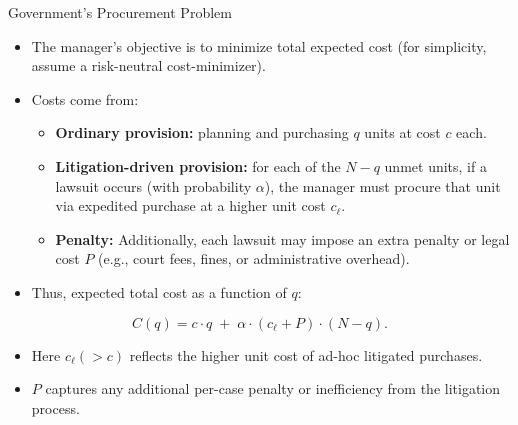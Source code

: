 \documentclass{beamer}
\begin{document}
\begin{frame}{Government’s Procurement Problem}
\begin{itemize}
  \item The manager’s objective is to minimize total expected cost (for simplicity, assume a risk-neutral cost-minimizer).
  \item Costs come from:
    \begin{itemize}
      \item \textbf{Ordinary provision:} planning and purchasing $q$ units at cost $c$ each.
      \item \textbf{Litigation-driven provision:} for each of the $N - q$ unmet units, if a lawsuit occurs (with probability $\alpha$), the manager must procure that unit via expedited purchase at a higher unit cost $c_{\ell}$.
      \item \textbf{Penalty:} Additionally, each lawsuit may impose an extra penalty or legal cost $P$ (e.g., court fees, fines, or administrative overhead).
    \end{itemize}
  \item Thus, expected total cost as a function of $q$:
\end{itemize}
\[
    C(q) = c \cdot q \;+\; \alpha \cdot (c_{\ell} + P) \cdot (N - q).
\]
\begin{itemize}
  \item Here $c_{\ell} (> c)$ reflects the higher unit cost of ad-hoc litigated purchases.
  \item $P$ captures any additional per-case penalty or inefficiency from the litigation process.
\end{itemize}
\end{frame}
\end{document}
